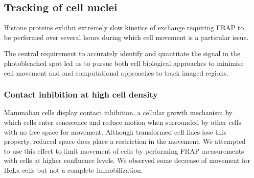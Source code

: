   \subsection{Tracking of cell nuclei}


    Histone proteins exhibit extremely slow kinetics of exchange
    requiring FRAP to be performed over several hours during which cell movement is
    a particular issue. %


    The central requirement to accurately identify and quantitate the signal
    in the photobleached spot led us to pursue both cell biological approaches to
    minimise cell movement and and computational approaches to track imaged regions.

    \subsubsection{Contact inhibition at high cell density}

      Mammalian cells display contact inhibition,
      a cellular growth mechanism by which cells enter senescence and reduce motion
      when surrounded by other cells with no free space for movement.
      Although transformed cell lines lose this property,
      reduced space does place a restriction in the movement.
      We attempted to use this effect to limit movement of cells
      by performing FRAP measurements with cells at higher confluence levels.
      We observed some decrease of movement for HeLa cells but not a complete immobilization.


